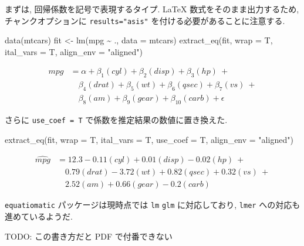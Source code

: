 \documentclass[
  xelatex,ja=standard,jafont=noto]{bxjsbook}
\newenvironment{Shaded}{\begin{snugshade}}{\end{snugshade}}
\newcommand{\AttributeTok}[1]{\textcolor[rgb]{0.77,0.63,0.00}{#1}}
\newcommand{\FunctionTok}[1]{\textcolor[rgb]{0.00,0.00,0.00}{#1}}
\newcommand{\NormalTok}[1]{#1}
\newcommand{\OtherTok}[1]{\textcolor[rgb]{0.56,0.35,0.01}{#1}}
\newcommand{\SpecialCharTok}[1]{\textcolor[rgb]{0.00,0.00,0.00}{#1}}
\newcommand{\StringTok}[1]{\textcolor[rgb]{0.31,0.60,0.02}{#1}}
\theoremstyle{definition}
\theoremstyle{definition}
\theoremstyle{definition}
\theoremstyle{definition}
\theoremstyle{remark}
\begin{document}
まずは, 回帰係数を記号で表現するタイプ. LaTeX
数式をそのまま出力するため, チャンクオプションに \texttt{results="asis"}
を付ける必要があることに注意する.

\begin{Shaded}
\begin{Highlighting}[numbers=left,,]
\FunctionTok{data}\NormalTok{(mtcars)}
\NormalTok{fit }\OtherTok{\textless{}{-}} \FunctionTok{lm}\NormalTok{(mpg }\SpecialCharTok{\textasciitilde{}}\NormalTok{ ., }\AttributeTok{data =}\NormalTok{ mtcars)}
\FunctionTok{extract\_eq}\NormalTok{(fit, }\AttributeTok{wrap =}\NormalTok{ T, }\AttributeTok{ital\_vars =}\NormalTok{ T, }\AttributeTok{align\_env =} \StringTok{"aligned"}\NormalTok{)}
\end{Highlighting}
\end{Shaded}

\[
\begin{aligned}
mpg &= \alpha + \beta_{1}(cyl) + \beta_{2}(disp) + \beta_{3}(hp)\ + \\
&\quad \beta_{4}(drat) + \beta_{5}(wt) + \beta_{6}(qsec) + \beta_{7}(vs)\ + \\
&\quad \beta_{8}(am) + \beta_{9}(gear) + \beta_{10}(carb) + \epsilon
\end{aligned}
\]

さらに \texttt{use\_coef\ =\ T} で係数を推定結果の数値に置き換えた.

\begin{Shaded}
\begin{Highlighting}[numbers=left,,]
\FunctionTok{extract\_eq}\NormalTok{(fit, }\AttributeTok{wrap =}\NormalTok{ T, }\AttributeTok{ital\_vars =}\NormalTok{ T, }\AttributeTok{use\_coef =}\NormalTok{ T, }\AttributeTok{align\_env =} \StringTok{"aligned"}\NormalTok{)}
\end{Highlighting}
\end{Shaded}

\[
\begin{aligned}
\widehat{mpg} &= 12.3 - 0.11(cyl) + 0.01(disp) - 0.02(hp)\ + \\
&\quad 0.79(drat) - 3.72(wt) + 0.82(qsec) + 0.32(vs)\ + \\
&\quad 2.52(am) + 0.66(gear) - 0.2(carb)
\end{aligned}
\]

\texttt{equatiomatic} パッケージは現時点では \texttt{lm} \texttt{glm}
に対応しており, \texttt{lmer} への対応も進めているようだ.

TODO: この書き方だと PDF で付番できない
\end{document}
